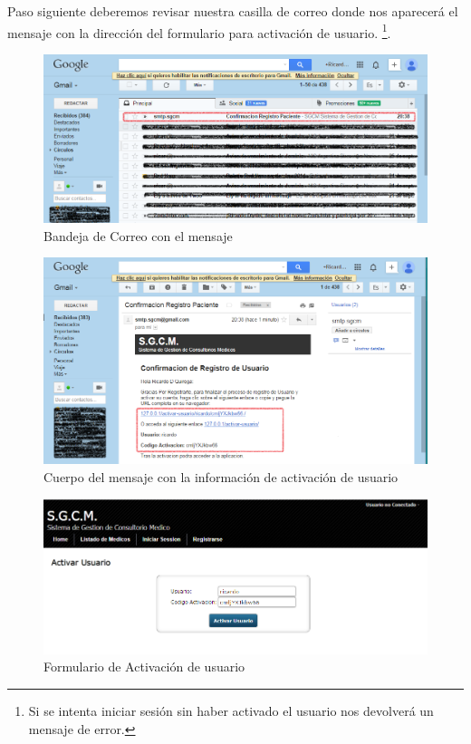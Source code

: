Paso siguiente deberemos revisar nuestra casilla de correo donde nos aparecerá el mensaje con la dirección del formulario para activación de usuario. \footnote{Si se intenta iniciar sesión sin haber activado el usuario nos devolverá un mensaje de error.}.

\begin{figure}[H]
    \centering
    \includegraphics[scale=0.5]{resourse/correo-bandeja.png}
    \caption{Bandeja de Correo con el mensaje}
    \label{fig:64}
\end{figure}

\begin{figure}[H]
    \centering
    \includegraphics[scale=0.5]{resourse/correo-mensaje.png}
    \caption{Cuerpo del mensaje con la información de activación de usuario}
    \label{fig:65}
\end{figure}

\begin{figure}[H]
    \centering
    \includegraphics[scale=0.5]{resourse/usuario-activar.png}
    \caption{Formulario de Activación de usuario}
    \label{fig:66}
\end{figure}


